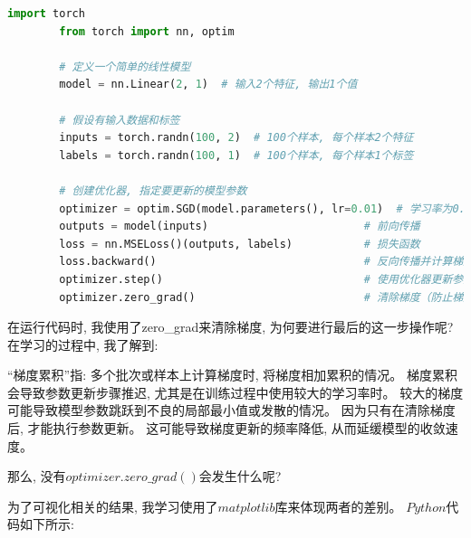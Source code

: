 \documentclass[printMode=false, declarePage=false]{ecnuthesis}
\begin{document}
    \begin{lstlisting}[language = python, title = {$SGD\ Algorithm$}]
        import torch
        from torch import nn, optim
        
        # 定义一个简单的线性模型
        model = nn.Linear(2, 1)  # 输入2个特征, 输出1个值
        
        # 假设有输入数据和标签
        inputs = torch.randn(100, 2)  # 100个样本, 每个样本2个特征
        labels = torch.randn(100, 1)  # 100个样本, 每个样本1个标签
        
        # 创建优化器, 指定要更新的模型参数
        optimizer = optim.SGD(model.parameters(), lr=0.01)  # 学习率为0.01
        outputs = model(inputs)                        # 前向传播
        loss = nn.MSELoss()(outputs, labels)           # 损失函数
        loss.backward()                                # 反向传播并计算梯度
        optimizer.step()                               # 使用优化器更新参数
        optimizer.zero_grad()                          # 清除梯度（防止梯度累积）
    \end{lstlisting}

    在运行代码时, 我使用了zero\_grad来清除梯度, 为何要进行最后的这一步操作呢?
    在学习的过程中,
    我了解到:

    ``梯度累积''指: 多个批次或样本上计算梯度时, 将梯度相加累积的情况。\cite{lin2017deep}
    梯度累积会导致参数更新步骤推迟,
    尤其是在训练过程中使用较大的学习率时。
    较大的梯度可能导致模型参数跳跃到不良的局部最小值或发散的情况。
    因为只有在清除梯度后, 才能执行参数更新。
    这可能导致梯度更新的频率降低, 从而延缓模型的收敛速度。

    那么, 没有$optimizer.zero\_grad()$会发生什么呢?

    为了可视化相关的结果,
    我学习使用了$matplotlib$库来体现两者的差别。
    $Python$代码如下所示:
\end{document}
